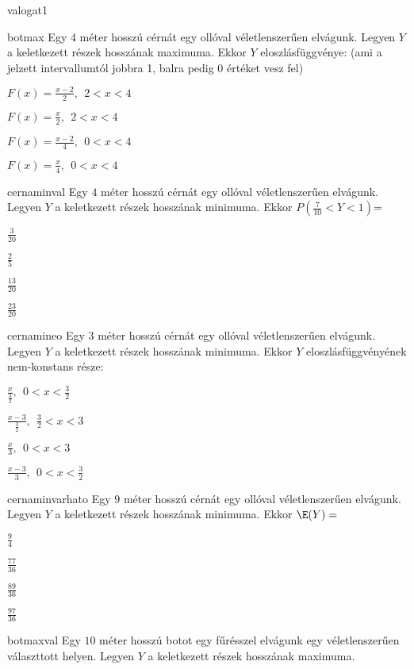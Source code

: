 \documentclass[12pt]{article}
\begin{document}
\begin{quiz}{valogat1}
\begin{multi}{botmax}
Egy $ 4 $ méter hosszú cérnát egy ollóval véletlenszerűen elvágunk.
Legyen $ Y $ a keletkezett részek hosszának maximuma.
Ekkor $ Y $ eloszlásfüggvénye: (ami a jelzett intervallumtól jobbra 1,
balra pedig 0 értéket vesz fel)
\item* $ F(x)=\frac{x-2}{2},\:\: 2<x<4 $
\item $ F(x)=\frac{x}{2},\:\: 2<x<4 $
\item $ F(x)=\frac{x-2}{4},\:\: 0<x<4 $
\item $ F(x)=\frac{x}{4},\:\: 0<x<4 $
\end{multi}
\begin{multi}{cernaminval}
Egy $ 4 $ méter hosszú cérnát egy ollóval véletlenszerűen elvágunk.
Legyen $ Y $ a keletkezett részek hosszának minimuma.
Ekkor $ P(\frac{7}{10}<Y<1) $=
\item* $ \frac{3}{20} $
\item $ \frac{2}{5} $
\item $ \frac{13}{20} $
\item $ \frac{23}{20} $
\end{multi}
\begin{multi}{cernamineo}
Egy $ 3 $ méter hosszú cérnát egy ollóval véletlenszerűen elvágunk.
Legyen $ Y $ a keletkezett részek hosszának minimuma.
Ekkor $ Y $ eloszlásfüggvényének nem-konstans része: 
\item* $ \frac{x}{\frac{3}{2}},\:\: 0<x<\frac{3}{2} $
\item $ \frac{x-3}{\frac{3}{2}},\:\: \frac{3}{2}<x<3 $
\item $ \frac{x}{3},\:\: 0<x<3 $
\item $ \frac{x-3}{3},\:\: 0<x<\frac{3}{2} $
\end{multi}
\begin{multi}{cernaminvarhato}
Egy $ 9 $ méter hosszú cérnát egy ollóval véletlenszerűen elvágunk.
Legyen $ Y $ a keletkezett részek hosszának minimuma.
Ekkor $\E(Y)=$
\item* $ \frac{9}{4} $
\item $ \frac{77}{36} $
\item $ \frac{89}{36} $
\item $ \frac{97}{36} $
\end{multi}
\begin{multi}{botmaxval}
Egy $ 10 $ méter hosszú botot egy fűrésszel elvágunk egy véletlenszerűen választtott
helyen.
Legyen $ Y $ a keletkezett részek hosszának maximuma.

\end{multi}
\end{quiz}
\end{document}
